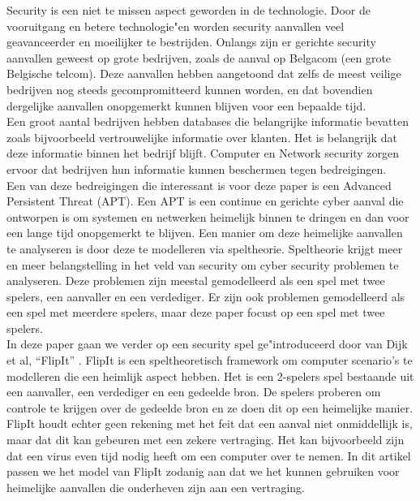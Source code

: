 \documentclass[master=cws, masteroption=vs,english]{kulemt}
\begin{document}
\begin{abstract*}
Security is een niet te missen aspect geworden in de technologie. Door de vooruitgang en betere technologie"en worden security aanvallen veel geavanceerder en moeilijker te bestrijden. Onlangs zijn er gerichte security aanvallen geweest op grote bedrijven, zoals de aanval op Belgacom (een grote Belgische telcom). Deze aanvallen hebben aangetoond dat zelfs de meest veilige
bedrijven nog steeds gecompromitteerd kunnen worden, en dat bovendien dergelijke aanvallen onopgemerkt kunnen blijven voor een bepaalde tijd. \\

Een groot aantal bedrijven hebben databases die belangrijke informatie bevatten zoals bijvoorbeeld vertrouwelijke informatie over klanten. Het is belangrijk dat deze informatie binnen het bedrijf blijft. Computer en Network security zorgen ervoor dat bedrijven hun informatie kunnen beschermen tegen bedreigingen. \\
Een van deze bedreigingen die interessant is voor deze paper is een Advanced Persistent Threat (APT). Een APT is een continue en gerichte cyber aanval die ontworpen is om systemen en netwerken heimelijk binnen te dringen en dan voor een lange tijd onopgemerkt te blijven. Een manier om deze heimelijke aanvallen te analyseren is door deze te modelleren via speltheorie. Speltheorie krijgt meer en meer belangstelling in het veld van security om cyber security problemen te analyseren. Deze problemen zijn meestal gemodelleerd als een spel met twee spelers, een aanvaller en een verdediger. Er zijn ook problemen gemodelleerd als een spel met meerdere spelers, maar deze paper focust op een spel met twee spelers. \\

In deze paper gaan we verder op een security spel ge"introduceerd door van Dijk et al, ``FlipIt'' \citep{FlipIt}.
FlipIt is een speltheoretisch framework om computer scenario's te modelleren die een heimlijk aspect hebben. Het is een 2-spelers spel bestaande uit een aanvaller, een verdediger en een gedeelde bron.  De spelers proberen om controle te krijgen over de gedeelde bron en ze
doen dit op een heimelijke manier. FlipIt houdt echter geen rekening met het feit dat een aanval niet onmiddellijk is, maar dat dit kan gebeuren met een zekere vertraging. Het kan bijvoorbeeld zijn dat een virus even tijd nodig heeft om een computer over te nemen. In dit artikel passen we het model van FlipIt zodanig aan dat we het kunnen gebruiken voor heimelijke aanvallen die onderheven zijn aan een vertraging.
 \\


\end{abstract*}
\end{document}
